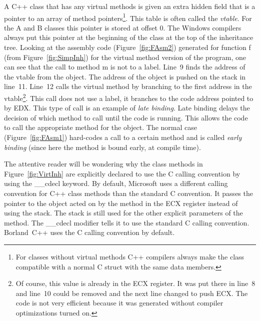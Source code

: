  A C++ class that has any virtual methods is given
an extra hidden field that is a pointer to an array of method
pointers\footnote{For classes without virtual methods C++ compilers
always make the class compatible with a normal C struct with the same
data members.}. This table is often called the \emph{vtable}. For the
{\code A} and {\code B} classes this pointer is stored at offset 0.
The Windows compilers always put this pointer at the beginning of the
class at the top of the inheritance tree. Looking at the assembly code
(Figure~\ref{fig:FAsm2}) generated for function {\code f} (from
Figure~\ref{fig:SimpInh}) for the virtual method version of the
program, one can see that the call to method {\code m} is not to a
label. Line~9 finds the address of the vtable from the object. The
address of the object is pushed on the stack in line~11. Line~12 calls
the virtual method by branching to the first address in the
vtable\footnote{Of course, this value is already in the {\code ECX}
register. It was put there in line~8 and line~10 could be removed and
the next line changed to push {\code ECX}. The code is not very
efficient because it was generated without compiler optimizations
turned on.}. This call does not use a label, it branches to the code
address pointed to by {\code EDX}. This type of call is an example of
\emph{late binding}. Late binding delays the
decision of which method to call until the code is running. This
allows the code to call the appropriate method for the object. The
normal case (Figure~\ref{fig:FAsm1}) hard-codes a call to a certain
method and is called \emph{early binding}
(since here the method is bound early, at compile time).

The attentive reader will be wondering why the class methods in
Figure~\ref{fig:VirtInh} are explicitly declared to use the C calling
convention by using the {\code \_\_cdecl} keyword. By default, Microsoft
uses a different calling convention for C++ class methods than the
standard C convention. It passes the pointer to the object acted on by
the method in the {\code ECX} register instead of using the stack. The
stack is still used for the other explicit parameters of the
method. The {\code \_\_cdecl} modifier tells it to use the standard C
calling convention. Borland~C++ uses the C calling convention by default.

